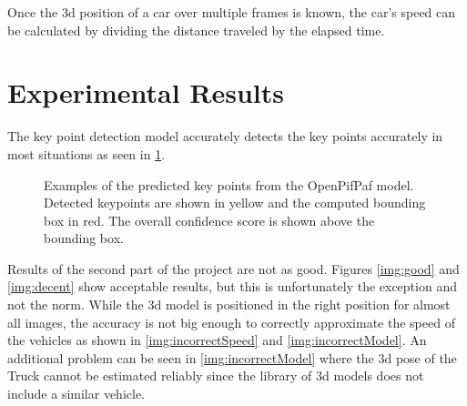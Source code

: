 \documentclass[conference]{IEEEtran}
\begin{document}
Once the 3d position of a car over multiple frames is known, the car's speed can be calculated by dividing the distance traveled by the elapsed time.

\section{Experimental Results}

The key point detection model accurately detects the key points accurately in most situations as seen in \ref{img:keypoints}.

\begin{figure}[h]
    \centering
    \caption{Examples of the predicted key points from the OpenPifPaf model. Detected keypoints are shown in yellow and the computed bounding box in red. The overall confidence score is shown above the bounding box.}
    \label{img:keypoints}
\end{figure}

Results of the second part of the project are not as good. Figures \ref{img:good} and \ref{img:decent} show acceptable results, but this is unfortunately the exception and not the norm. While the 3d model is positioned in the right position for almost all images, the accuracy is not big enough to correctly approximate the speed of the vehicles as shown in \ref{img:incorrectSpeed} and \ref{img:incorrectModel}. An additional problem can be seen in \ref{img:incorrectModel} where the 3d pose of the Truck cannot be estimated reliably since the library of 3d models does not include a similar vehicle. 
\end{document}
